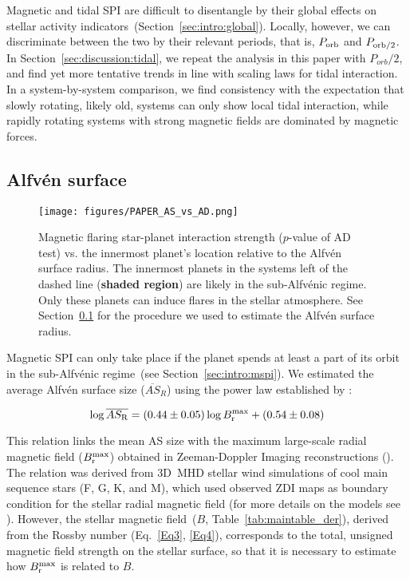 \documentclass[twocolumn]{aastex631}
\begin{document}
Magnetic and tidal SPI are difficult to disentangle by their global effects on stellar activity indicators~(Section~\ref{sec:intro:global}). Locally, however, we can discriminate between the two by their relevant periods, that is, $P_{\rm orb}$ and $P_{\rm orb /2}$. In Section~\ref{sec:discussion:tidal}, we repeat the analysis in this paper with $P_{orb}/2$, and find yet more tentative trends in line with scaling laws for tidal interaction. In a system-by-system comparison, we find consistency with the expectation that slowly rotating, likely old, systems can only show local tidal interaction, while rapidly rotating systems with strong magnetic fields are dominated by magnetic forces.
\subsection{Alfv\'en surface}
\label{sec:discussion:as}

\begin{figure}[t]
    \begin{centering}
        \texttt{[image: figures/PAPER\_AS\_vs\_AD.png]}
    \caption{Magnetic flaring star-planet interaction strength ($p$-value of AD test) vs. the innermost planet's location relative to the Alfv\'en surface radius. The innermost planets in the systems left of the dashed line (\textbf{shaded region}) are likely in the sub-Alfv\'enic regime. Only these planets can induce flares in the stellar atmosphere. See Section~\ref{sec:discussion:as} for the procedure we used to estimate the Alfv\'en surface radius. }
        \label{fig:as}
    \end{centering}
\end{figure}

Magnetic SPI can only take place if the planet spends at least a part of its orbit in the sub-Alfv\'enic regime~(see Section~\ref{sec:intro:mspi}). We estimated the average Alfv\'en surface size ($\overline{AS}_{R}$) using the power law established by \citet{Chebly2023}:

\begin{equation}
    \log \overline{AS_{\rm R}} = (0.44 \pm 0.05) \log B_{\rm r}^{\rm max} + (0.54 \pm 0.08)\label{AS_estimation}
\end{equation}

This relation links the mean AS size with the maximum large-scale radial magnetic field ($B_{\rm r}^{\rm max}$) obtained in Zeeman-Doppler Imaging reconstructions (\citealt{donati2006surprising, morin2008largescale, fares2009magnetic, alvarado-gomez2015activity, hussain2016spectropolarimetric, kochukhov2020mapping}). The relation was derived from 3D~MHD stellar wind simulations of cool main sequence stars (F, G, K, and M), which used observed ZDI maps as boundary condition for the stellar radial magnetic field (for more details on the models see \citealt{Chebly2023}). However, the stellar magnetic field~($B$, Table~\ref{tab:maintable_der}), derived from the Rossby number (Eq.~\ref{Eq3}, \ref{Eq4}), corresponds to the total, unsigned magnetic field strength on the stellar surface, so that it is necessary to estimate how $B_{\rm r}^{\rm max}$ is related to $B$. 
\end{document}
